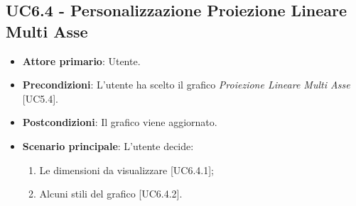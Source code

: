 \subsection{UC6.4 - Personalizzazione Proiezione Lineare Multi Asse}
\begin{itemize}
	\item \textbf{Attore primario}: Utente.
	
	\item \textbf{Precondizioni}: L'utente ha scelto il grafico \textit{Proiezione Lineare Multi Asse} [UC5.4].
	
	\item \textbf{Postcondizioni}: Il grafico viene aggiornato.
	
	\item \textbf{Scenario principale}: L'utente decide:
	
\begin{enumerate}
\item Le dimensioni da visualizzare [UC6.4.1];
\item Alcuni stili del grafico [UC6.4.2].
\end{enumerate}	
		
\end{itemize}